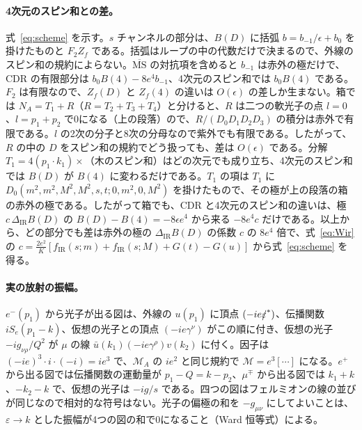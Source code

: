 \documentclass[a4paper,10pt]{ltjsarticle}
\newcommand{\MSbar}{\overline{\mathrm{MS}}}
\newcommand{\DIR}{\Delta_{\mathrm{IR}}}
\begin{document}
\paragraph{4次元のスピン和との差。}式~\eqref{eq:scheme} を示す。$s$ チャンネルの部分は、$B(D)$ に括弧 $b=b_{-1}/\epsilon+b_0$ を掛けたものと $F_2Z_f$ である。括弧はループの中の代数だけで決まるので、外線のスピン和の規約によらない。$\MSbar$ の対抗項を含めると $b_{-1}$ は赤外の極だけで、CDR の有限部分は $b_0B(4)-8e^4b_{-1}$、4次元のスピン和では $b_0B(4)$ である。$F_2$ は有限なので、$Z_f(D)$ と $Z_f(4)$ の違いは $O(\epsilon)$ の差しか生まない。箱では $N_A=T_1+R$（$R=T_2+T_3+T_4$）と分けると、$R$ は二つの軟光子の点 $l=0$、$l=p_1+p_2$ で0になる（上の段落）ので、$R/(D_0D_1D_2D_3)$ の積分は赤外で有限である。$l$ の2次の分子と8次の分母なので紫外でも有限である。したがって、$R$ の中の $D$ をスピン和の規約でどう扱っても、差は $O(\epsilon)$ である。分解 $T_1=4(p_1\cdot k_1)\times$（木のスピン和）はどの次元でも成り立ち、4次元のスピン和では $B(D)$ が $B(4)$ に変わるだけである。$T_1$ の項は $T_1$ に $D_0(m^2,m^2,M^2,M^2,s,t;0,m^2,0,M^2)$ を掛けたもので、その極が上の段落の箱の赤外の極である。したがって箱でも、CDR と4次元のスピン和の違いは、極 $c\,\DIR B(D)$ の $B(D)-B(4)=-8\epsilon e^4$ から来る $-8e^4c$ だけである。以上から、どの部分でも差は赤外の極の $\DIR B(D)$ の係数 $c$ の $8e^4$ 倍で、式~\eqref{eq:Wir} の $c=\frac{2e^2}{K}[f_{\mathrm{IR}}(s;m)+f_{\mathrm{IR}}(s;M)+G(t)-G(u)]$ から式~\eqref{eq:scheme} を得る。

\paragraph{実の放射の振幅。}$e^-(p_1)$ から光子が出る図は、外線の $u(p_1)$ に頂点 $(-ie\slashed\varepsilon^*)$、伝播関数 $iS_e(p_1-k)$、仮想の光子との頂点 $(-ie\gamma^\nu)$ がこの順に付き、仮想の光子 $-ig_{\nu\rho}/Q^2$ が $\mu$ の線 $\bar u(k_1)(-ie\gamma^\rho)v(k_2)$ に付く。因子は $(-ie)^3\cdot i\cdot(-i)=ie^3$ で、$\mathcal M_A$ の $ie^2$ と同じ規約で $\mathcal M=e^3[\cdots]$ になる。$e^+$ から出る図では伝播関数の運動量が $p_1-Q=k-p_2$、$\mu^\mp$ から出る図では $k_1+k$、$-k_2-k$ で、仮想の光子は $-ig/s$ である。四つの図はフェルミオンの線の並びが同じなので相対的な符号はない。光子の偏極の和を $-g_{\mu\nu}$ にしてよいことは、$\varepsilon\to k$ とした振幅が4つの図の和で0になること（Ward 恒等式）による。
\end{document}
